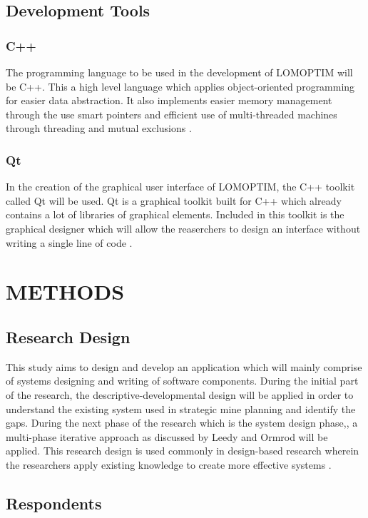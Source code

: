 \documentclass[12pt]{report}
\begin{document}
\section{Development Tools}

\subsection{C++}

The programming language to be used in the development of LOMOPTIM will be C++.
This a high level language which applies object-oriented programming for easier data abstraction.
It also implements easier memory management through the use smart pointers and efficient use of multi-threaded machines through threading and mutual exclusions \cite{cpp}.

\subsection{Qt}

In the creation of the graphical user interface of LOMOPTIM, the C++ toolkit called Qt will be used.
Qt is a graphical toolkit built for C++ which already contains a lot of libraries of graphical elements.
Included in this toolkit is the graphical designer which will allow the reaserchers to design an interface without writing a single line of code \cite{qt}.

\chapter{METHODS}

\section{Research Design}

This study aims to design and develop an application which will mainly comprise of systems designing and writing of software components.
During the initial part of the research, the descriptive-developmental design will be applied in order to understand the existing system used in strategic mine planning and identify the gaps.
During the next phase of the research which is the system design phase,, a multi-phase iterative approach as discussed by Leedy and Ormrod will be applied.
This research design is used commonly in design-based research wherein the researchers apply existing knowledge to create more effective systems \cite{MixedMethod}.

\section{Respondents}
\end{document}
